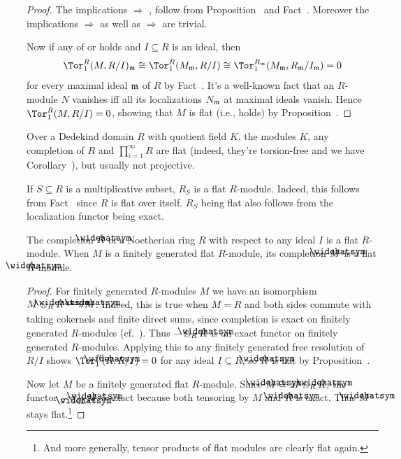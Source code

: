 \documentclass[a4paper,parskip=half,numbers=enddot, DIV=12]{scrreprt}
\begin{document}
\begin{proof}
	The implications  $\Rightarrow$ ,  follow from Proposition~ and Fact~. Moreover the implications  $\Rightarrow$  as well as  $\Rightarrow$  are trivial.
	
	Now if any of  or  holds and $I\subseteq R$ is an ideal, then
	\begin{align*}
		\Tor_1^R(M,R/I)_\mm\cong \Tor_1^R(M_\mm,R/I)\cong \Tor_1^{R_\mm}(M_\mm,R_\mm/I_\mm)=0
	\end{align*}
	for every maximal ideal $\mathfrak{m}$ of $R$ by Fact~. It's a well-known fact that an $R$-module $N$ vanishes iff all its localizations $N_{\mathfrak{m}}$ at maximal ideals vanish. Hence $\Tor_1^R(M,R/I)=0$, showing that $M$ is flat (i.e.,  holds) by Proposition~.
\end{proof}
\begin{example}
	Over a Dedekind domain $R$ with quotient field $K$, the modules $K$, any completion of $R$ and $\prod_{i=1}^{\infty}R$ are flat (indeed, they're torsion-free and we have Corollary~), but usually not projective.
\end{example}
\begin{example}
	If $S\subseteq R$ is a multiplicative subset, $R_S$ is a flat $R$-module. Indeed, this follows from Fact~ since $R$ is flat over itself. $R_S$ being flat also follows from the localization functor being exact.
\end{example}
\begin{example}
	The completion $\roof{R}$ of a Noetherian ring $R$ with respect to any ideal $I$ is a flat $R$-module. When $M$ is a finitely generated flat $R$-module, its completion $\roof{M}$ is a flat $\roof{R}$-module.
\end{example}
\begin{proof}
	For finitely generated $R$-modules $M$ we have an isomorphism $M\otimes_R\roof{R}\isomorphism \roof{M}$. Indeed, this is true when $M=R$ and both sides commute with taking cokernels and finite direct sums, since completion is exact on finitely generated $R$-modules (cf.\ \cite[Lemma~7.15]{eisenbudCommAlg}). Thus $-\otimes_R\roof{R}$ is an exact functor on finitely generated $R$-modules. Applying this to any finitely generated free resolution of $R/I$ shows $\Tor_1^R(\roof{R},R/I)=0$ for any ideal $I\subseteq R$, so $\roof{R}$ is flat by Proposition~.
	
	Now let $M$ be a finitely generated flat $R$-module. Since $\roof{M}\cong M\otimes_R\roof{R}$, the functor $-\otimes_{\roof{R}}\roof{M}$ is exact because both tensoring by $M$ and $\roof{R}$ is exact. Thus $\roof{M}$ stays flat.\footnote{And more generally, tensor products of flat modules are clearly flat again.}
\end{proof}
\end{document}
